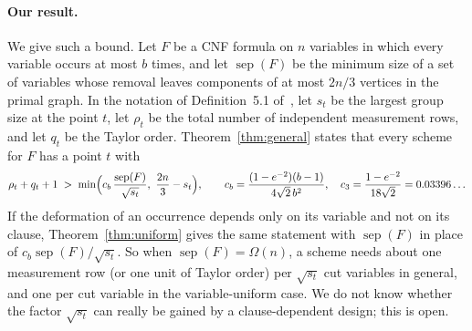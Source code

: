 \documentclass[11pt,a4paper]{article}
\theoremstyle{definition}
\theoremstyle{remark}
\newcommand{\sep}{\operatorname{sep}}
\begin{document}
\paragraph{Our result.} We give such a bound. Let $F$ be a CNF formula on $n$ variables in
which every variable occurs at most $b$ times, and let $\sep(F)$ be the minimum size of a set
of variables whose removal leaves components of at most $2n/3$ vertices in the primal graph.
In the notation of Definition~5.1 of~\cite{DL}, let $s_t$ be the largest group size at the
point $t$, let $\rho_t$ be the total number of independent measurement rows, and let $q_t$ be
the Taylor order. Theorem~\ref{thm:general} states that every scheme for $F$ has a point $t$
with
\begin{equation}\label{eq:intro}
\rho_t+q_t+1\;>\;\min\Bigl(c_b\,\frac{\sep(F)}{\sqrt{s_t}},\ \frac{2n}{3}-s_t\Bigr),
\qquad c_b=\frac{(1-e^{-2})(b-1)}{4\sqrt2\,b^2},\quad c_3=\frac{1-e^{-2}}{18\sqrt2}=0.03396\ldots
\end{equation}
If the deformation of an occurrence depends only on its variable and not on its clause,
Theorem~\ref{thm:uniform} gives the same statement with $\sep(F)$ in place of
$c_b\sep(F)/\sqrt{s_t}$. So when $\sep(F)=\Omega(n)$, a scheme needs about one measurement row
(or one unit of Taylor order) per $\sqrt{s_t}$ cut variables in general, and one per cut
variable in the variable-uniform case. We do not know whether the factor $\sqrt{s_t}$ can
really be gained by a clause-dependent design; this is open.
\end{document}

